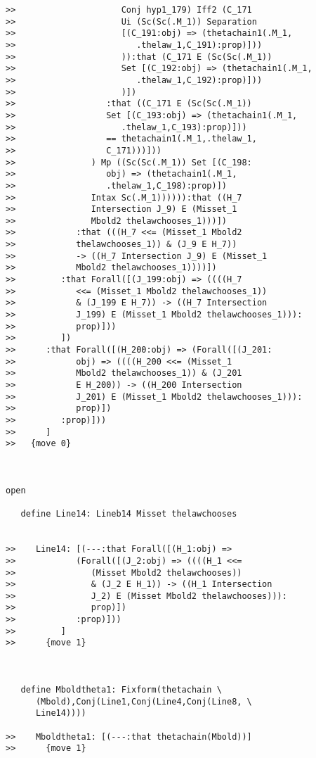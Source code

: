 \documentclass[12pt]{article}
\begin{document}
\begin{verbatim}
>>                     Conj hyp1_179) Iff2 (C_171
>>                     Ui (Sc(Sc(.M_1)) Separation
>>                     [(C_191:obj) => (thetachain1(.M_1,
>>                        .thelaw_1,C_191):prop)]))
>>                     )):that (C_171 E (Sc(Sc(.M_1))
>>                     Set [(C_192:obj) => (thetachain1(.M_1,
>>                        .thelaw_1,C_192):prop)]))
>>                     )])
>>                  :that ((C_171 E (Sc(Sc(.M_1))
>>                  Set [(C_193:obj) => (thetachain1(.M_1,
>>                     .thelaw_1,C_193):prop)]))
>>                  == thetachain1(.M_1,.thelaw_1,
>>                  C_171)))]))
>>               ) Mp ((Sc(Sc(.M_1)) Set [(C_198:
>>                  obj) => (thetachain1(.M_1,
>>                  .thelaw_1,C_198):prop)])
>>               Intax Sc(.M_1)))))):that ((H_7
>>               Intersection J_9) E (Misset_1
>>               Mbold2 thelawchooses_1)))])
>>            :that (((H_7 <<= (Misset_1 Mbold2
>>            thelawchooses_1)) & (J_9 E H_7))
>>            -> ((H_7 Intersection J_9) E (Misset_1
>>            Mbold2 thelawchooses_1))))])
>>         :that Forall([(J_199:obj) => ((((H_7
>>            <<= (Misset_1 Mbold2 thelawchooses_1))
>>            & (J_199 E H_7)) -> ((H_7 Intersection
>>            J_199) E (Misset_1 Mbold2 thelawchooses_1))):
>>            prop)]))
>>         ])
>>      :that Forall([(H_200:obj) => (Forall([(J_201:
>>            obj) => ((((H_200 <<= (Misset_1
>>            Mbold2 thelawchooses_1)) & (J_201
>>            E H_200)) -> ((H_200 Intersection
>>            J_201) E (Misset_1 Mbold2 thelawchooses_1))):
>>            prop)])
>>         :prop)]))
>>      ]
>>   {move 0}



open

   define Line14: Lineb14 Misset thelawchooses


>>    Line14: [(---:that Forall([(H_1:obj) =>
>>            (Forall([(J_2:obj) => ((((H_1 <<=
>>               (Misset Mbold2 thelawchooses))
>>               & (J_2 E H_1)) -> ((H_1 Intersection
>>               J_2) E (Misset Mbold2 thelawchooses))):
>>               prop)])
>>            :prop)]))
>>         ]
>>      {move 1}



   define Mboldtheta1: Fixform(thetachain \
      (Mbold),Conj(Line1,Conj(Line4,Conj(Line8, \
      Line14))))

>>    Mboldtheta1: [(---:that thetachain(Mbold))]
>>      {move 1}




\end{verbatim}
\end{document}
